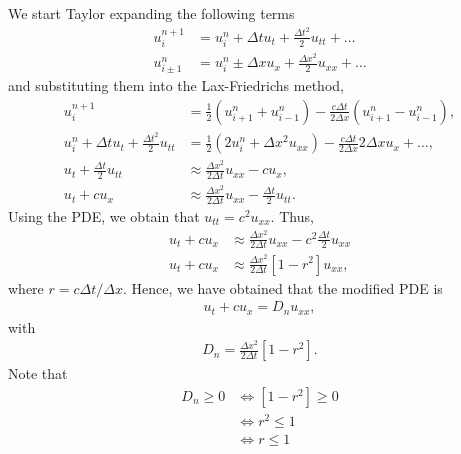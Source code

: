 \begin{questions}

\begin{solution}
We start Taylor expanding the following terms
\begin{align*}
u_i^{n+1}&=u_i^n+\Delta tu_t+\frac{\Delta t^2}{2}u_{tt}+\dots\\
u_{i\pm 1}^n&=u_i^n\pm\Delta xu_x+\frac{\Delta x^2}{2}u_{xx}+\dots
\end{align*}
and substituting them into the Lax-Friedrichs method,
\begin{align*}
u^{n+1}_i&=\frac{1}{2}\left(u^n_{i+1}+u^n_{i-1}\right)-\frac{c\Delta t}{2\Delta x}\left(u^n_{i+1}-u^n_{i-1}\right),\\
u_i^n+\Delta tu_t+\frac{\Delta t^2}{2}u_{tt}&=\frac{1}{2}\left(2u_i^n+\Delta x^2u_{xx}\right)-\frac{c\Delta t}{2\Delta x}2\Delta x u_x+\dots,\\
u_t+\frac{\Delta t}{2}u_{tt}&\approx\frac{\Delta x^2}{2\Delta t}u_{xx}-cu_x,\\
u_t+cu_x&\approx\frac{\Delta x^2}{2\Delta t}u_{xx}-\frac{\Delta t}{2}u_{tt}.
\end{align*}
Using the PDE, we obtain that $u_{tt}=c^2u_{xx}$. Thus,
\begin{align*}
u_t+cu_x&\approx\frac{\Delta x^2}{2\Delta t}u_{xx}-c^2\frac{\Delta t}{2}u_{xx}\\
u_t+cu_x&\approx\frac{\Delta x^2}{2\Delta t}\left[1-r^2\right]u_{xx},
\end{align*}
where $r=c\Delta t/\Delta x$. Hence, we have obtained that the modified PDE is
\begin{align*}
u_t+cu_x=D_nu_{xx},
\end{align*}
with
\begin{align*}
D_n=\frac{\Delta x^2}{2\Delta t}\left[1-r^2\right].
\end{align*}
Note that
\begin{align*}
D_n\geq 0&\iff \left[1-r^2\right]\geq 0\\
&\iff r^2\leq 1\\
&\iff r\leq 1\\
\end{align*}
\end{solution}
\end{questions}
